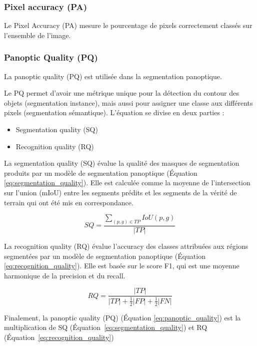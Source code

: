 \subsubsection{Pixel accuracy (PA)}

Le Pixel Accuracy (PA) mesure le pourcentage de pixels correctement classés sur l'ensemble de l'image.

\subsubsection{Panoptic Quality (PQ)}

La panoptic quality (PQ) \cite{kirillov_panoptic_2019} est utilisée dans la segmentation panoptique.

Le PQ permet d'avoir une métrique unique pour la détection du contour des objets (segmentation instance), mais aussi pour assigner une classe aux différents pixels (segmentation sémantique). L'équation se divise en deux parties :
\begin{itemize}
    \item Segmentation quality (SQ)
    \item Recognition quality (RQ)
\end{itemize}

La segmentation quality (SQ) \cite{kirillov_panoptic_2019} évalue la qualité des masques de segmentation produits par un modèle de segmentation panoptique (Équation \ref{eq:segmentation_quality}). Elle est calculée comme la moyenne de l'intersection sur l'union (mIoU) entre les segments prédits et les segments de la vérité de terrain qui ont été mis en correspondance.

\begin{equation}
SQ = \frac{\sum_{(p,g) \in TP} IoU(p,g)}{|TP|}
\label{eq:segmentation_quality}
\end{equation}

La recognition quality (RQ) \cite{kirillov_panoptic_2019} évalue l'accuracy des classes attribuées aux régions segmentées par un modèle de segmentation panoptique (Équation \ref{eq:recognition_quality}). Elle est basée sur le score F1, qui est une moyenne harmonique de la precision et du recall.

\begin{equation}
RQ = \frac{|TP|}{|TP| + \frac{1}{2}|FP| + \frac{1}{2}|FN|}
\label{eq:recognition_quality}
\end{equation}

Finalement, la panoptic quality (PQ) \cite{kirillov_panoptic_2019} (Équation \ref{eq:panoptic_quality}) est la multiplication de SQ (Équation~\ref{eq:segmentation_quality}) et RQ (Équation~\ref{eq:recognition_quality})

